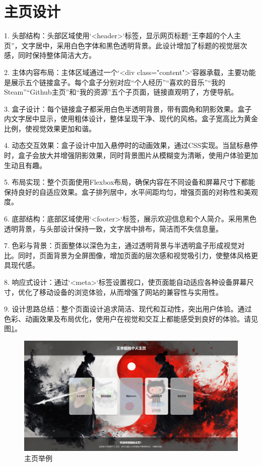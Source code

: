 \documentclass[supercite]{Experimental_Report}
\theoremstyle{definition}
\begin{document}
\newpage

\section{主页设计}

1. 头部结构：头部区域使用`<header>`标签，显示网页标题“王李超的个人主页”，文字居中，采用白色字体和黑色透明背景。此设计增加了标题的视觉层次感，同时保持整体简洁大方。

2. 主体内容布局：主体区域通过一个`<div class="content">`容器承载，主要功能是展示五个链接盒子。每个盒子分别对应“个人经历”“喜欢的音乐”“我的Steam”“Github主页”和“我的资源”五个子页面，链接直观明了，方便导航。

3. 盒子设计：每个链接盒子都采用白色半透明背景，带有圆角和阴影效果。盒子内文字居中显示，使用粗体设计，整体呈现干净、现代的风格。盒子宽高比为黄金比例，使视觉效果更加和谐。

4. 动态交互效果：盒子设计中加入悬停时的动画效果，通过CSS实现。当鼠标悬停时，盒子会放大并增强阴影效果，同时背景图片从模糊变为清晰，使用户体验更加生动且有趣。

5. 布局实现：整个页面使用Flexbox布局，确保内容在不同设备和屏幕尺寸下都能保持良好的自适应效果。盒子排列居中，水平间距均匀，增强页面的对称性和美观度。

6. 底部结构：底部区域使用`<footer>`标签，展示欢迎信息和个人简介。采用黑色透明背景，与头部设计保持一致，文字居中排布，简洁而不失信息量。

7. 色彩与背景：页面整体以深色为主，通过透明背景与半透明盒子形成视觉对比。同时，页面背景为全屏图像，增加页面的层次感和视觉吸引力，使整体风格更具现代感。

8. 响应式设计：通过`<meta>`标签设置视口，使页面能自动适应各种设备屏幕尺寸，优化了移动设备的浏览体验，从而增强了网站的兼容性与实用性。

9. 设计思路总结：整个页面设计追求简洁、现代和互动性，突出用户体验。通过色彩、动画效果及布局优化，使用户在视觉和交互上都能感受到良好的体验。请见图\ref{fig2-1}。

\begin{figure}[htb]
	\begin{center}
		\includegraphics[scale=0.30]{images/2-1.png}
		\caption{主页举例}
		\label{fig2-1}
	\end{center}
\end{figure}
\end{document}
